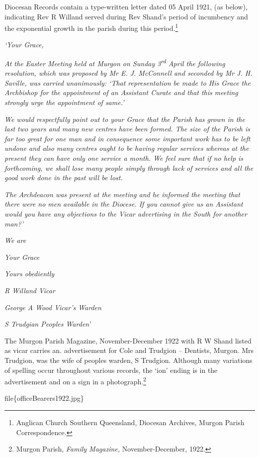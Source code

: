 Diocesan Records contain a type-written letter dated 05 April 1921, (as below), indicating Rev R Willand served during Rev Shand's period of incumbency and the exponential growth in the parish during this period.\footnote{Anglican Church Southern Queensland, Diocesan Archives, Murgon Parish Correspondence.}

\emph{`Your Grace,}

\emph{At the Easter Meeting held at Murgon on Sunday 3\textsuperscript{rd} April the following resolution, which was proposed by Mr E. J. McConnell and seconded by Mr J. H. Saville, was carried unanimously: `That representation be made to His Grace the Archbishop for the appointment of an Assistant Curate and that this meeting strongly urge the appointment of same.'}

\emph{We would respectfully point out to your Grace that the Parish has grown in the last two years and many new centres have been formed. The size of the Parish is far too great for one man and in consequence some important work has to be left undone and also many centres ought to be having regular services whereas at the present they can have only one service a month. We feel sure that if no help is forthcoming, we shall lose many people simply through lack of services and all the good work done in the past will be lost.}

\emph{The Archdeacon was present at the meeting and he informed the meeting that there were no men available in the Diocese. If you cannot give us an Assistant would you have any objections to the Vicar advertising in the South for another man?'}

\emph{We are}

\emph{Your Grace}

\emph{Yours obediently}

\emph{R Willand Vicar}

\emph{George A Wood Vicar's Warden}

\emph{S Trudgian Peoples Warden'}

The Murgon Parish Magazine, November-December 1922 with R W Shand listed as vicar carries an. advertisement for Cole and Trudgion -- Dentists, Murgon. Mrs Trudgion, was the wife of peoples warden, S Trudgion. Although many variations of spelling occur throughout various records, the `ion' ending is in the advertisement and on a sign in a photograph.\footnote{Murgon Parish, \emph{Family Magazine,} November-December, 1922.}

file\{officeBearers1922.jpg\}

